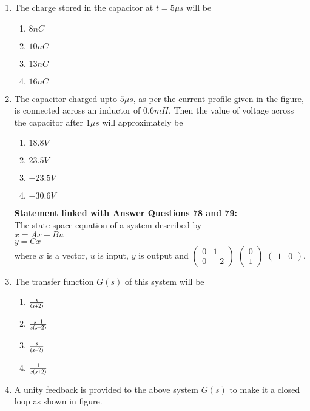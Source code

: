 \documentclass[journal]{IEEEtran}
\begin{document}
\begin{enumerate}
\begin{figure}[!ht]
\label{fig:my_label}
\end{figure}\\
\item The charge stored in the capacitor at $t=5\mu s$ will be 
\begin{enumerate}
    \item $8 nC$
    \item $10 nC$
    \item $13 nC$
    \item $16 nC$
\end{enumerate}
\item The capacitor charged upto $5\mu s$, as per the current profile given in the figure, is connected across an inductor of $0.6 mH$. Then the value of voltage across the capacitor after $1 \mu s$ will approximately be
 \begin{enumerate}
     \item $18.8 V$
     \item $23.5 V$
     \item $-23.5 V$
     \item $-30.6V$
 \end{enumerate}
\textbf{Statement linked with Answer Questions 78 and 79:}
\\
The state space equation of a system described by \\
\textbf{$x=Ax+Bu$}\\
\textbf{$y=Cx$}\\
where $x$ is a vector, $u$ is input, $y$ is output and $\begin{pmatrix}
0 & 1 \\
0 & -2
\end{pmatrix}$   $\begin{pmatrix}
0 \\
1
\end{pmatrix}$  $\begin{pmatrix}
1 & 0
\end{pmatrix}$.\\
\item The transfer function $G(s)$ of this system will be 
\begin{enumerate}
    \item $\frac{s}{\left(s+2\right)}$
    \item $\frac{s+1}{s\left(s-2\right)}$ 
    \item $\frac{s}{\left(s-2\right)}$
    \item $\frac{1}{s\left(s+2\right)}$
\end{enumerate}
\item A unity feedback is provided to the above system $G(s)$ to make it a closed loop as shown in figure.\\

\end{enumerate}
\end{document}
